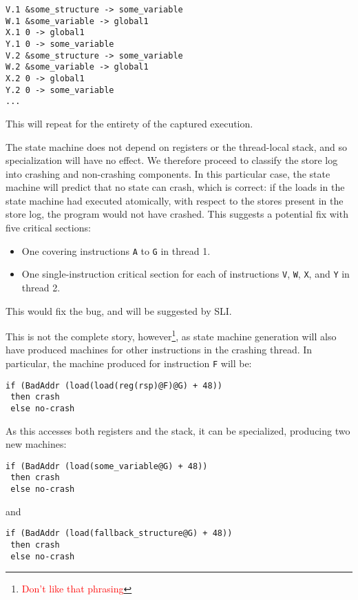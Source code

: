 \documentclass[10pt,twocolumn,preprint,natbib,authoryear]{sigplanconf}
\newcommand{\editorial}[1]{\textcolor{red}{\footnote{\textcolor{red}{#1}}}}
\begin{document}
\begin{verbatim}
V.1 &some_structure -> some_variable
W.1 &some_variable -> global1
X.1 0 -> global1
Y.1 0 -> some_variable
V.2 &some_structure -> some_variable
W.2 &some_variable -> global1
X.2 0 -> global1
Y.2 0 -> some_variable
...
\end{verbatim}

This will repeat for the entirety of the captured execution.

The state machine does not depend on registers or the thread-local
stack, and so specialization will have no effect.  We therefore
proceed to classify the store log into crashing and non-crashing
components.  In this particular case, the state machine will predict
that no state can crash, which is correct: if the loads in the state
machine had executed atomically, with respect to the stores present in
the store log, the program would not have crashed.  This suggests a
potential fix with five critical sections:

\begin{itemize}
\item One covering instructions \verb|A| to \verb|G| in thread 1.
\item One single-instruction critical section for each of instructions
  \verb|V|, \verb|W|, \verb|X|, and \verb|Y| in thread 2.
\end{itemize}

This would fix the bug, and will be suggested by SLI.

This is not the complete story, however\editorial{Don't like that
  phrasing}, as state machine generation will also have produced
machines for other instructions in the crashing thread.  In
particular, the machine produced for instruction \verb|F| will be:

\begin{verbatim}
if (BadAddr (load(load(reg(rsp)@F)@G) + 48))
 then crash
 else no-crash
\end{verbatim}

As this accesses both registers and the stack, it can be specialized,
producing two new machines:

\begin{verbatim}
if (BadAddr (load(some_variable@G) + 48))
 then crash
 else no-crash
\end{verbatim}

and

\begin{verbatim}
if (BadAddr (load(fallback_structure@G) + 48))
 then crash
 else no-crash
\end{verbatim}
\end{document}
